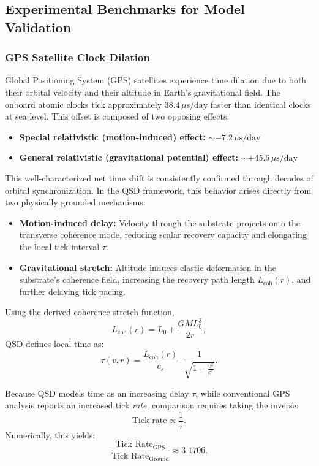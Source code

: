 \documentclass[entropy,article,submit,pdftex,moreauthors]{Definitions/mdpi}
\begin{document}
\subsection[\appendixname~\thesubsection]{Experimental Benchmarks for Model Validation}
\subsubsection{GPS Satellite Clock Dilation}

Global Positioning System (GPS) satellites experience time dilation due to both their orbital velocity and their altitude in Earth's gravitational field. The onboard atomic clocks tick approximately \( 38.4 \, \mu\text{s/day} \) faster than identical clocks at sea level. This offset is composed of two opposing effects:

\begin{itemize}
  \item \textbf{Special relativistic (motion-induced) effect:} \( \sim -7.2 \, \mu\text{s/day} \)
  \item \textbf{General relativistic (gravitational potential) effect:} \( \sim +45.6 \, \mu\text{s/day} \)
\end{itemize}

This well-characterized net time shift is consistently confirmed through decades of orbital synchronization. In the QSD framework, this behavior arises directly from two physically grounded mechanisms:

\begin{itemize}
  \item \textbf{Motion-induced delay:} Velocity through the substrate projects onto the transverse coherence mode, reducing scalar recovery capacity and elongating the local tick interval \( \tau \).
  \item \textbf{Gravitational stretch:} Altitude induces elastic deformation in the substrate’s coherence field, increasing the recovery path length \( L_{\text{coh}}(r) \), and further delaying tick pacing.
\end{itemize}

Using the derived coherence stretch function,
\[
L_{\text{coh}}(r) = L_0 + \frac{GM L_0^3}{2r},
\]
QSD defines local time as:
\[
\tau(v, r) =
\frac{L_{\text{coh}}(r)}{c_s}
\cdot \frac{1}{\sqrt{1 - \frac{v^2}{c^2}}}.
\]

Because QSD models time as an increasing delay \( \tau \), while conventional GPS analysis reports an increased tick \textit{rate}, comparison requires taking the inverse:
\[
\text{Tick rate} \propto \frac{1}{\tau}.
\]
Numerically, this yields:
\[
\frac{\text{Tick Rate}_{\text{GPS}}}{\text{Tick Rate}_{\text{Ground}}} \approx 3.1706.
\]
\end{document}
